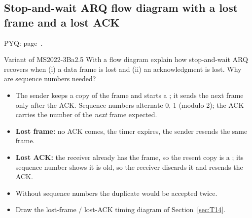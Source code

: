 \subsection{Stop-and-wait ARQ flow diagram with a lost frame and a lost ACK}\label{iq:C22}
     \quad PYQ: page~\pageref{q:MS2022-3Ba}.
\begin{question}{Variant of MS2022-3Ba}{2.5}
With a flow diagram explain how stop-and-wait ARQ recovers when (i) a data frame is lost and (ii) an acknowledgment is lost. Why are sequence numbers needed?
\end{question}
\begin{solution}[outline]
\begin{itemize}
\item The sender keeps a copy of the frame and starts a ; it sends the next frame only after the ACK. Sequence numbers alternate 0, 1 (modulo 2); the ACK carries the number of the \emph{next} frame expected.
\item \textbf{Lost frame:} no ACK comes, the timer expires, the sender resends the same frame.
\item \textbf{Lost ACK:} the receiver already has the frame, so the resent copy is a ; its sequence number shows it is old, so the receiver discards it and resends the ACK.
\item Without sequence numbers the duplicate would be accepted twice.
\item Draw the lost-frame / lost-ACK timing diagram of Section~\ref{sec:T14}.
\end{itemize}
\end{solution}

